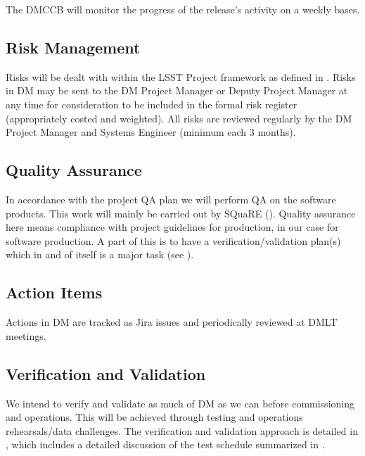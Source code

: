 The DMCCB will monitor the progress of the release's activity on a weekly bases.

\subsection {Risk Management } \label{sect:risk}

Risks will be dealt with within the LSST Project framework as defined in .
Risks in DM may be sent to the DM Project Manager or Deputy Project Manager at any time for consideration to be included in the formal risk register (appropriately costed and weighted). All risks are reviewed regularly by the DM Project Manager and Systems Engineer (minimum each 3 months).


\subsection {Quality Assurance  } \label{sect:pa}

In accordance with the project QA plan  we will perform QA on the software products.
This work will mainly be carried out by SQuaRE ().
Quality assurance here means compliance with project guidelines for production, in our case for software production.
A part of this is to have a verification/validation plan(s) which in and of itself is a major task (see ).


\subsection{Action Items }
Actions in DM are tracked as Jira issues and periodically reviewed at DMLT meetings.


\subsection {Verification and Validation } \label{sect:vanv}

We intend to verify and validate as much of DM as we can before commissioning and operations.
This will be achieved through testing and operations rehearsals/data challenges.
The verification and validation approach is detailed in , which includes a detailed discussion of the test schedule summarized in .
